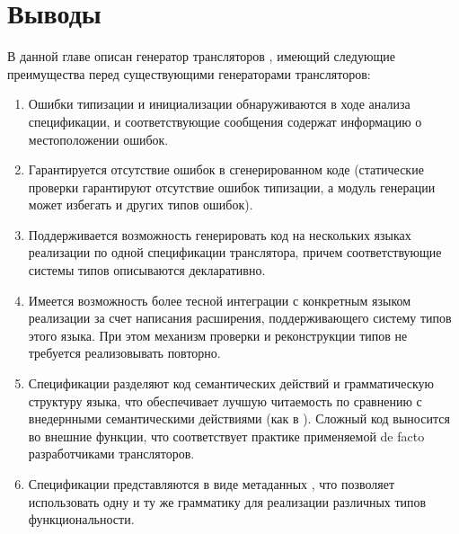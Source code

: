 \chapter{Выводы}

В данной главе описан генератор трансляторов \ATF{}, имеющий следующие преимущества перед существующими генераторами трансляторов:
\begin{enumerate}
\item Ошибки типизации и инициализации обнаруживаются в ходе анализа спецификации, и соответствующие сообщения содержат информацию о местоположении ошибок.
\item Гарантируется отсутствие ошибок в сгенерированном коде (статические проверки гарантируют отсутствие ошибок типизации, а модуль генерации может избегать и других типов ошибок).
\item Поддерживается возможность генерировать код на нескольких языках реализации по одной спецификации транслятора, причем соответствующие системы типов описываются декларативно.
\item Имеется возможность более тесной интеграции с конкретным языком реализации за счет написания расширения, поддерживающего систему типов этого языка. При этом механизм проверки и реконструкции типов не требуется реализовывать повторно.
\item Спецификации разделяют код семантических действий и грамматическую структуру языка, что обеспечивает лучшую читаемость по сравнению с внедернными семантическими действиями (как в ). Сложный код выносится во внешние функции, что соответствует практике применяемой de facto разработчиками трансляторов.
\item Спецификации представляются в виде метаданных \GRM{}, что позволяет использовать одну и ту же грамматику для реализации различных типов функциональности.
\end{enumerate}